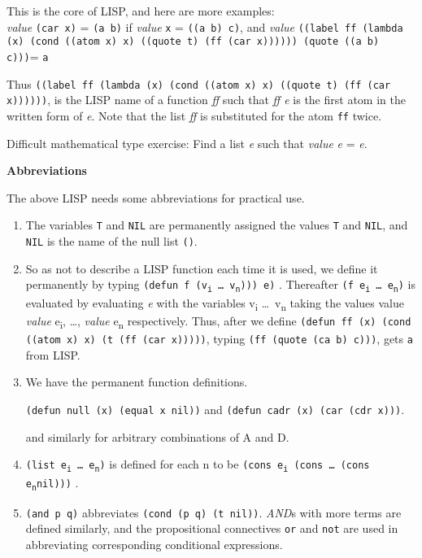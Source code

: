 \documentclass[8pt,letter,twocolumn]{article}
\newcommand{\args}[1] {#1\textsubscript{i} \dots \ #1\textsubscript{n}}
\newcommand{\ei}[0] {e\textsubscript{i}}
\newcommand{\en}[0] {e\textsubscript{n}}
\begin{document}
This is the core of LISP, and here are more examples:  \\

\textit{value} \texttt{(car x)} = \texttt{(a b)} if \textit{value} \texttt{x} =
\texttt{((a b) c)}, and \textit{value} \texttt{((label ff (lambda (x) (cond
  ((atom x) x) ((quote t) (ff (car x)))))) (quote ((a b) c)))}= \texttt{a}

Thus \texttt{((label ff (lambda (x) (cond ((atom x) x) ((quote t) (ff (car
  x))))))}, is the LISP name of a function \textit{ff} such that \textit{ff e}
is the first atom in the written form of \textit{e}. Note that the list
\textit{ff} is substituted for the atom \texttt{ff} twice.

Difficult mathematical type exercise: Find a list \textit{e} such that
\textit{value} \textit{e} = \textit{e}.

\vspace*{1\baselineskip}
\textbf{Abbreviations}
\vspace*{1\baselineskip}

The above LISP needs some abbreviations for practical use.

\begin{enumerate}
\setlength\itemsep{0em}

\item The variables \texttt{T} and \texttt{NIL} are permanently assigned the
  values \texttt{T} and \texttt{NIL}, and \texttt{NIL} is the name of the null
  list \texttt{()}.

\item So as not to describe a LISP function each time it is used, we define it
  permanently by typing \texttt{(defun f (\args{v}))) e)} . Thereafter
  \texttt{(f \args{e})} is evaluated by evaluating \textit{e} with the variables
  \args{v} taking the values value \textit{value} \ei, \dots, \textit{value} \en
  respectively. Thus, after we define \texttt{(defun ff (x) (cond ((atom x) x)
    (t (ff (car x)))))}, typing \texttt{(ff (quote (ca b) c)))}, gets \texttt{a}
  from LISP.

\item We have the permanent function definitions.

  \texttt{(defun null (x) (equal x nil))} and \texttt{(defun cadr (x) (car (cdr
    x)))}.

  and similarly for arbitrary combinations of A and D.

\item \texttt{(list \args{e})} is defined for each n to be \texttt{(cons \ei
    (cons \dots \ (cons \en nil)))} .

\item \texttt{(and p q)} abbreviates \texttt{(cond (p q) (t nil))}.
  \textit{AND}s with more terms are defined similarly, and the propositional
  connectives \texttt{or} and \texttt{not} are used in abbreviating
  corresponding conditional expressions.

\end{enumerate}
\end{document}
